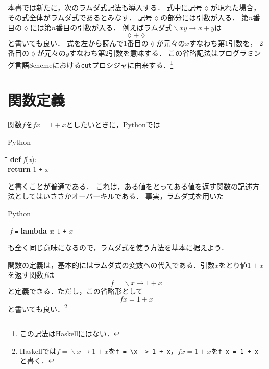 \documentclass[twocolumn]{jsbook}
\newcommand{\programminglanguage}[1]{\textsf{#1}}
\newcommand{\haskell}{\programminglanguage{Haskell}}
\newcommand{\python}{\programminglanguage{Python}}
\newcommand{\scheme}{\programminglanguage{Scheme}}
\newcommand{\code}[1]{\texttt{#1}}
\newenvironment{pythoncode}{\begin{itembox}[r]{\python}}{\end{itembox}}
\newenvironment{pythontab}{\begin{tabbing}\hspace*{1em}\=\hspace*{1em}\=\hspace*{1em}\=\hspace*{1em}\=\kill}{\end{tabbing}}
\newcommand{\pthnId}[1]{\textit{#1}}
\newcommand{\pthnKeyword}[1]{\textbf{#1}}
\newcommand{\pthnOp}[1]{\texttt{#1}}
\DeclareMathOperator{\mathLambda}{\backslash}
\newcommand{\mathLambdaAnonymousParameter}{\lozenge}
\newcommand{\mathLambdaArrow}{\rightarrow}
\newcommand{\mathLambdaExpression}[2]{\mathLambda#1\mathLambdaArrow#2}
\begin{document}
本書では新たに，次のラムダ式記法も導入する．
式中に記号$\mathLambdaAnonymousParameter$が現れた場合，
その式全体がラムダ式であるとみなす．
記号$\mathLambdaAnonymousParameter$の部分には引数が入る．
第$n$番目の$\mathLambdaAnonymousParameter$には第$n$番目の引数が入る．
例えばラムダ式$\mathLambdaExpression{xy}{x+y}$は
\begin{equation*}
\mathLambdaAnonymousParameter+\mathLambdaAnonymousParameter
\end{equation*}
と書いても良い．
式を左から読んで1番目の$\mathLambdaAnonymousParameter$が元々の$x$すなわち第1引数を，
2番目の$\mathLambdaAnonymousParameter$が元々の$y$すなわち第2引数を意味する．
この省略記法はプログラミング言語\scheme における\code{cut}プロシジャに由来する．\footnote{この記法は\haskell にはない．}


\section{関数定義}

関数$f$を$fx=1+x$としたいときに，\python では
\begin{pythoncode}
\begin{pythontab}
\pthnKeyword{def} \pthnId{f}(\pthnId{x}):\\
\>\pthnKeyword{return} $1$ \pthnOp{+} \pthnId{x}
\end{pythontab}
\end{pythoncode}
と書くことが普通である．
これは，ある値をとってある値を返す関数の記述方法としてはいささかオーバーキルである．
事実，ラムダ式を用いた
\begin{pythoncode}
\begin{pythontab}
\pthnId{f} \pthnOp{=} \pthnKeyword{lambda} \pthnId{x}: $1$ \pthnOp{+} \pthnId{x}
\end{pythontab}
\end{pythoncode}
も全く同じ意味になるので，ラムダ式を使う方法を基本に据えよう．

関数の定義は，基本的にはラムダ式の変数への代入である．引数$x$をとり値$1+x$を返す関数$f$は
\begin{equation}
f=\mathLambdaExpression{x}{1+x}
\end{equation}
と定義できる．ただし，この省略形として
\begin{equation}
fx=1+x
\end{equation}
と書いても良い．\footnote{\haskell では$f=\mathLambdaExpression{x}{1+x}$を\code{f = \textbackslash x -> 1 + x}，$fx=1+x$を\code{f x = 1 + x}と書く．}
\end{document}
